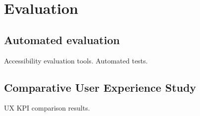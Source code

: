 \chapter{Evaluation}


\section{Automated evaluation}

Accessibility evaluation tools. Automated tests.

\section{Comparative User Experience Study}

UX KPI comparison results.
